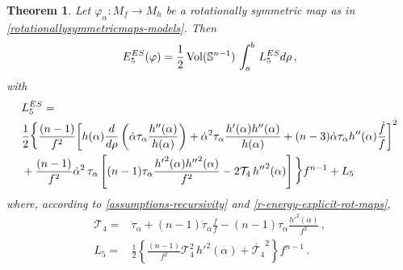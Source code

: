 \documentclass[11pt]{amsart}
\theoremstyle{plain}
\newtheorem{theorem}                {Theorem}      [section]
\theoremstyle{definition}
\numberwithin{equation}{section}
\def \s{{\mathbb S}}
\numberwithin{equation}{section}
\begin{document}
\begin{theorem}\label{th-Euler-Lag-r=5} Let $\varphi_\alpha:M_f \to M_h$ be 
a rotationally symmetric map as in \eqref{rotationallysymmetricmaps-models}.
Then
\[
E^{ES}_5(\varphi)=\frac{1}{2}\,{\rm Vol}(\s^{n-1})\,\int_a^b\, L_5^{ES} d\rho\,,
\]
with
{\footnotesize
\begin{equation}\label{eq:ES-5-energy}
\begin{split}
&L_5^{ES}=\\
&\frac{1}{2}  {\Large\Big\{}\frac{(n-1)}{f^2} { \left[ h(\alpha) \frac{d}{d \rho}\left(\dot{\alpha} \tau_{\alpha} \frac{h''(\alpha)}{h(\alpha)}\right) +  \dot{\alpha}^2 \tau_{\alpha} \frac{h'(\alpha)h''(\alpha)}{h(\alpha)}+ (n-3) \dot{\alpha} \tau_{\alpha} h''(\alpha)\frac{\dot{f}}{f} \right]^2}\\&
+{\frac{(n-1)}{f^2}} {\dot\alpha}^2\, \tau_{\alpha}  \left[{(n-1)}\tau_{\alpha} \frac{{h'}^2(\alpha ) {h''}^2(\alpha )}{f^2} - {2 \mathcal{T}_{4}\, {h''}^2(\alpha )}\right]{\Large\Big\}}f^{n-1}+L_5
\end{split}
\end{equation}
}
where, according to \eqref{assumptions-recursivity} and \eqref{r-energy-explicit-rot-maps}, 
\[
\begin{split}
\mathcal{T}_{4}=&\ddot\tau_{\alpha} + (n-1)\dot\tau_{\alpha}\frac{ \dot f }{f} -(n-1) \tau_{\alpha}\frac{ {h'}^2(\alpha)}{f^2}\,,\\
L_5=&\frac{1}{2} \left\{\frac{(n-1)}{f^2}{\mathcal{T}_{4}^2\, {h'}^2(\alpha)}+\dot{\mathcal{T}_{4}}^2\right\} f^{n-1}\,.
\end{split}
\]
\end{theorem}
\end{document}
